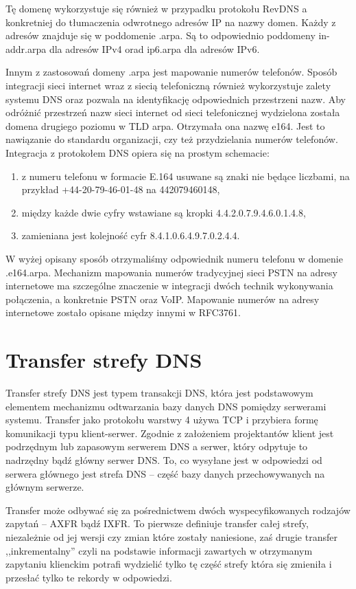 Tę domenę wykorzystuje się również w przypadku protokołu RevDNS a konkretniej do tłumaczenia
odwrotnego adresów IP na nazwy domen. Każdy z adresów znajduje się w poddomenie .arpa. Są to odpowiednio poddomeny in-addr.arpa dla
adresów IPv4 orad ip6.arpa dla adresów IPv6.

Innym z zastosowań domeny .arpa jest mapowanie numerów telefonów. Sposób integracji sieci internet wraz z siecią telefoniczną również
wykorzystuje zalety systemu DNS oraz pozwala na identyfikację odpowiednich przestrzeni nazw. Aby odróżnić przestrzeń nazw sieci
internet od sieci telefonicznej wydzielona została domena drugiego poziomu w TLD arpa. Otrzymała ona nazwę e164. Jest to nawiązanie
do standardu organizacji, czy też przydzielania numerów telefonów. Integracja z protokołem DNS opiera się na prostym schemacie:
\begin{enumerate}
	\item z numeru telefonu w formacie E.164 usuwane są znaki nie będące liczbami, na przykład +44-20-79-46-01-48 na 442079460148,
	\item między każde dwie cyfry wstawiane są kropki 4.4.2.0.7.9.4.6.0.1.4.8,
	\item zamieniana jest kolejność cyfr 8.4.1.0.6.4.9.7.0.2.4.4.
\end{enumerate}

W wyżej opisany sposób otrzymaliśmy odpowiednik numeru telefonu w domenie .e164.arpa. Mechanizm mapowania numerów tradycyjnej sieci
PSTN na adresy internetowe ma szczególne znaczenie w integracji dwóch technik wykonywania połączenia, a konkretnie PSTN oraz VoIP.
Mapowanie numerów na adresy internetowe zostało opisane między innymi w RFC3761\cite{RFC3761}.

\section{Transfer strefy DNS}
Transfer strefy DNS jest typem transakcji DNS, która jest podstawowym elementem mechanizmu odtwarzania bazy danych DNS pomiędzy
serwerami systemu. Transfer jako protokołu warstwy 4 używa TCP i przybiera formę komunikacji typu klient-serwer. Zgodnie z założeniem
projektantów klient jest podrzędnym lub zapasowym serwerem DNS a serwer, który odpytuje to nadrzędny bądź główny serwer DNS. To, co
wysyłane jest w odpowiedzi od serwera głównego jest strefa DNS -- część bazy danych przechowywanych na głównym serwerze.

Transfer może odbywać się za pośrednictwem dwóch wyspecyfikowanych rodzajów zapytań -- AXFR\cite{RFC1034, RFC5936} bądź
IXFR\cite{RFC1995}. To pierwsze definiuje transfer całej strefy, niezależnie od jej wersji czy zmian które zostały naniesione,
zaś drugie transfer ,,inkrementalny'' czyli na podstawie informacji zawartych w otrzymanym zapytaniu klienckim potrafi wydzielić
tylko tę część strefy która się zmieniła i przesłać tylko te rekordy w odpowiedzi.

